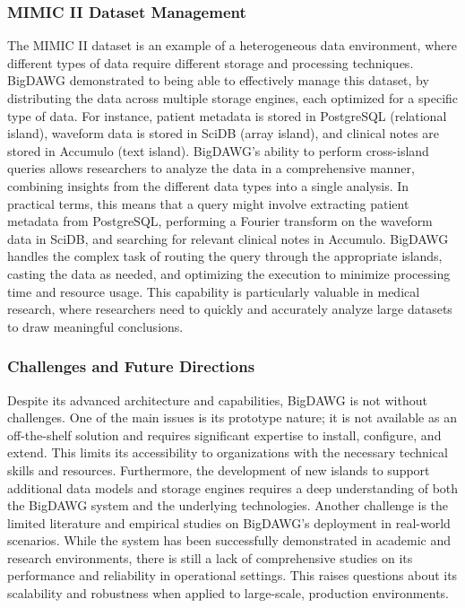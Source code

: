 \subsubsection{MIMIC II Dataset Management}
The MIMIC II dataset is an example of a heterogeneous data environment, where different types of data require different storage and processing techniques. \ac{BigDAWG} demonstrated to being able to effectively manage this dataset, by distributing the data across multiple storage engines, each optimized for a specific type of data. For instance, patient metadata is stored in PostgreSQL (relational island), waveform data is stored in SciDB (array island), and clinical notes are stored in Accumulo (text island). \ac{BigDAWG}'s ability to perform cross-island queries allows researchers to analyze the data in a comprehensive manner, combining insights from the different data types into a single analysis.
In practical terms, this means that a query might involve extracting patient metadata from PostgreSQL, performing a Fourier transform on the waveform data in SciDB, and searching for relevant clinical notes in Accumulo. \ac{BigDAWG} handles the complex task of routing the query through the appropriate islands, casting the data as needed, and optimizing the execution to minimize processing time and resource usage. This capability is particularly valuable in medical research, where researchers need to quickly and accurately analyze large datasets to draw meaningful conclusions.
\subsubsection{Challenges and Future Directions}
Despite its advanced architecture and capabilities, \ac{BigDAWG} is not without challenges. One of the main issues is its prototype nature; it is not available as an off-the-shelf solution and requires significant expertise to install, configure, and extend. This limits its accessibility to organizations with the necessary technical skills and resources. Furthermore, the development of new islands to support additional data models and storage engines requires a deep understanding of both the \ac{BigDAWG} system and the underlying technologies.
Another challenge is the limited literature and empirical studies on \ac{BigDAWG}'s deployment in real-world scenarios. While the system has been successfully demonstrated in academic and research environments, there is still a lack of comprehensive studies on its performance and reliability in operational settings. This raises questions about its scalability and robustness when applied to large-scale, production environments.
